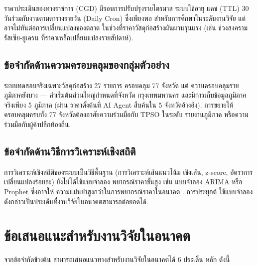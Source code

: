 ราคาประเมินของทางราชการ (CGD) มีรอบการปรับปรุงรายไตรมาส ระบบใช้อายุ
แคช (TTL) 30 วันร่วมกับงานตามตารางรายวัน (Daily Cron) ซึ่งเพียงพอ
สำหรับการศึกษาในระดับงานวิจัย แต่อาจไม่ทันต่อการเปลี่ยนแปลงของตลาด
ในช่วงที่ราคาวัสดุก่อสร้างผันผวนรุนแรง (เช่น ช่วงสงครามรัสเซีย-ยูเครน
ที่ราคาเหล็กเปลี่ยนแปลงรายสัปดาห์).

\subsection{ข้อจำกัดด้านความครอบคลุมของกลุ่มตัวอย่าง}

ระบบทดสอบจริงเฉพาะวัสดุก่อสร้าง 27 รายการ ครอบคลุม 77 จังหวัด แต่
ความครอบคลุมรายภูมิภาคยังบาง — ค่าเริ่มต้นส่วนใหญ่กำหนดที่จังหวัด
กรุงเทพมหานคร และมีการเก็บข้อมูลภูมิภาคจริงเพียง 5 ภูมิภาค (ผ่าน
ราคาตั้งต้นที่ AI Agent สืบค้นใน 5 จังหวัดอ้างอิง). การขยายให้
ครอบคลุมครบทั้ง 77 จังหวัดต้องอาศัยความร่วมมือกับ TPSO ในระดับ
รายงานภูมิภาค หรือความร่วมมือกับผู้ค้าปลีกท้องถิ่น.

\subsection{ข้อจำกัดด้านวิธีการวิเคราะห์เชิงสถิติ}

การวิเคราะห์เชิงสถิติของระบบเป็นวิธีพื้นฐาน (การวิเคราะห์เส้นแนวโน้ม
เชิงเส้น, z-score, อัตราการเปลี่ยนแปลงร้อยละ) ยังไม่ได้ใช้แบบจำลอง
พยากรณ์ราคาขั้นสูง เช่น แบบจำลอง ARIMA หรือ Prophet ซึ่งอาจให้
ความแม่นยำสูงกว่าในการพยากรณ์ราคาในอนาคต \cite{liu2024}. การประยุกต์
ใช้แบบจำลองดังกล่าวเป็นประเด็นที่งานวิจัยในอนาคตสามารถต่อยอดได้.

\section{ข้อเสนอแนะสำหรับงานวิจัยในอนาคต}
\label{sec:future-work}

จากข้อจำกัดข้างต้น สามารถเสนอแนวทางสำหรับงานวิจัยในอนาคตได้ 6 ประเด็น
หลัก ดังนี้

